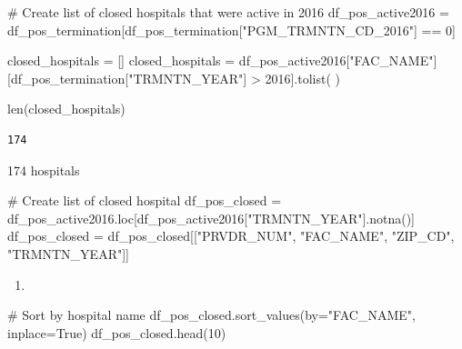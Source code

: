 \documentclass[
  letterpaper,
  DIV=11,
  numbers=noendperiod]{scrartcl}
\newenvironment{Shaded}{\begin{snugshade}}{\end{snugshade}}
\newcommand{\BuiltInTok}[1]{\textcolor[rgb]{0.00,0.23,0.31}{#1}}
\newcommand{\CommentTok}[1]{\textcolor[rgb]{0.37,0.37,0.37}{#1}}
\newcommand{\DecValTok}[1]{\textcolor[rgb]{0.68,0.00,0.00}{#1}}
\newcommand{\NormalTok}[1]{\textcolor[rgb]{0.00,0.23,0.31}{#1}}
\newcommand{\OperatorTok}[1]{\textcolor[rgb]{0.37,0.37,0.37}{#1}}
\newcommand{\StringTok}[1]{\textcolor[rgb]{0.13,0.47,0.30}{#1}}
\newcommand{\VariableTok}[1]{\textcolor[rgb]{0.07,0.07,0.07}{#1}}
\providecommand{\tightlist}{%
  \setlength{\itemsep}{0pt}\setlength{\parskip}{0pt}}\usepackage{longtable,booktabs,array}
\begin{document}
\begin{Shaded}
\begin{Highlighting}[]
\CommentTok{\# Create list of closed hospitals that were active in 2016}
\NormalTok{df\_pos\_active2016 }\OperatorTok{=}\NormalTok{ df\_pos\_termination[df\_pos\_termination[}\StringTok{"PGM\_TRMNTN\_CD\_2016"}\NormalTok{] }\OperatorTok{==} \DecValTok{0}\NormalTok{]}

\NormalTok{closed\_hospitals }\OperatorTok{=}\NormalTok{ []}
\NormalTok{closed\_hospitals }\OperatorTok{=}\NormalTok{ df\_pos\_active2016[}\StringTok{"FAC\_NAME"}\NormalTok{][df\_pos\_termination[}\StringTok{"TRMNTN\_YEAR"}\NormalTok{] }\OperatorTok{\textgreater{}} \DecValTok{2016}\NormalTok{].tolist(}
\NormalTok{)}

\BuiltInTok{len}\NormalTok{(closed\_hospitals)}
\end{Highlighting}
\end{Shaded}

\begin{verbatim}
174
\end{verbatim}

174 hospitals

\begin{Shaded}
\begin{Highlighting}[]
\CommentTok{\# Create list of closed hospital}
\NormalTok{df\_pos\_closed }\OperatorTok{=}\NormalTok{ df\_pos\_active2016.loc[df\_pos\_active2016[}\StringTok{"TRMNTN\_YEAR"}\NormalTok{].notna()]}
\NormalTok{df\_pos\_closed }\OperatorTok{=}\NormalTok{ df\_pos\_closed[[}\StringTok{"PRVDR\_NUM"}\NormalTok{,}
                               \StringTok{"FAC\_NAME"}\NormalTok{, }\StringTok{"ZIP\_CD"}\NormalTok{, }\StringTok{"TRMNTN\_YEAR"}\NormalTok{]]}
\end{Highlighting}
\end{Shaded}

\begin{enumerate}
\def\labelenumi{\arabic{enumi}.}
\setcounter{enumi}{1}
\tightlist
\item
\end{enumerate}

\begin{Shaded}
\begin{Highlighting}[]
\CommentTok{\# Sort by hospital name}
\NormalTok{df\_pos\_closed.sort\_values(by}\OperatorTok{=}\StringTok{"FAC\_NAME"}\NormalTok{, inplace}\OperatorTok{=}\VariableTok{True}\NormalTok{)}
\NormalTok{df\_pos\_closed.head(}\DecValTok{10}\NormalTok{)}
\end{Highlighting}
\end{Shaded}
\end{document}
